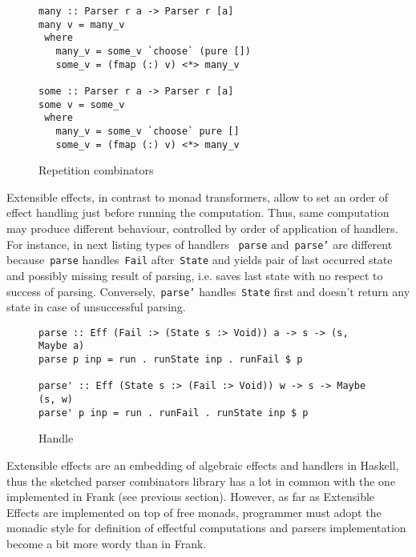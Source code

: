       \begin{figure}[h]
      \begin{lstlisting}
many :: Parser r a -> Parser r [a]
many v = many_v
 where
   many_v = some_v `choose` (pure [])
   some_v = (fmap (:) v) <*> many_v

some :: Parser r a -> Parser r [a]
some v = some_v
 where
   many_v = some_v `choose` pure []
   some_v = (fmap (:) v) <*> many_v
      \end{lstlisting}
      \caption{Repetition combinators}
      \label{listing:ExtEffParsersChoose}
      \end{figure}

      Extensible effects, in contrast to monad transformers, allow to set an order of
      effect handling just before running the computation. Thus, same computation may
      produce different behaviour, controlled by order of application of
      handlers. For instance, in next listing types of handlers
      ~\texttt{parse} and~\texttt{parse'} are different because~\texttt{parse}
      handles~\texttt{Fail} after~\texttt{State} and yields pair of last occurred
      state and possibly missing result of parsing, i.e. saves last state with no respect
      to success of parsing. Conversely,~\texttt{parse'} handles~\texttt{State}
      first and doesn't return any state in case of unsuccessful parsing.

      \begin{figure}[h]
      \begin{lstlisting}
parse :: Eff (Fail :> (State s :> Void)) a -> s -> (s, Maybe a)
parse p inp = run . runState inp . runFail $ p

parse' :: Eff (State s :> (Fail :> Void)) w -> s -> Maybe (s, w)
parse' p inp = run . runFail . runState inp $ p
      \end{lstlisting}
      \caption{Handle}
      \label{listing:ExtEffParsersParse}
      \end{figure}

      Extensible effects are an embedding of algebraic effects and handlers in Haskell,
      thus the sketched parser combinators library has a lot in common with the one
      implemented in Frank (see previous section). However, as far as Extensible
      Effects are implemented on top of free monads, programmer must adopt the monadic
      style for definition of effectful computations and parsers implementation
      become a bit more wordy than in Frank.
